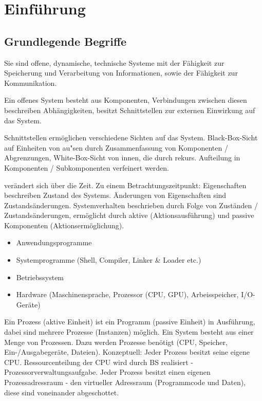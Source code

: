 \section{Einführung}
\subsection{Grundlegende Begriffe}
Sie sind offene, dynamische, technische Systeme mit der Fähigkeit zur Speicherung und Verarbeitung von Informationen, sowie der Fähigkeit zur Kommunikation.

Ein offenes System besteht aus Komponenten, Verbindungen zwischen diesen beschreiben Abhängigkeiten, besitzt Schnittstellen zur externen Einwirkung auf das System. 

Schnittstellen ermöglichen verschiedene Sichten auf das System. Black-Box-Sicht auf Einheiten von au"sen durch Zusammenfassung von Komponenten / Abgrenzungen, White-Box-Sicht von innen, die durch rekurs. Aufteilung in Komponenten / Subkomponenten verfeinert werden.
 
 verändert sich über die Zeit. Zu einem Betrachtungszeitpunkt: Eigenschaften beschreiben Zustand des Systems. Änderungen von Eigenschaften sind Zustands\-änderungen. System\-verhalten beschrieben durch Folge von Zuständen / Zustandsänderungen, ermöglicht durch aktive (Aktionsausführung) und passive Komponenten (Aktionsermöglichung).  

\begin{itemize} 	\setlength\itemsep{0em}
	\item Anwendungsprogramme
	\item Systemprogramme (Shell, Compiler, Linker \& Loader etc.)
	\item Betriebssystem
	\item Hardware (Maschinensprache, Prozessor (CPU, GPU), Arbeisspeicher, I/O-Geräte)
\end{itemize}

Ein Prozess (aktive Einheit) ist ein Programm (passive Einheit) in Ausführung, dabei sind mehrere Prozesse (Instanzen) möglich. Ein System besteht aus einer Menge von Prozessen. Dazu werden Prozesse benötigt (CPU, Speicher, Ein-/Ausgabegeräte, Dateien). Konzeptuell: Jeder Prozess besitzt seine eigene CPU. Ressourcenteilung der CPU wird durch BS realisiert - Prozessorverwaltungsaufgabe. Jeder Prozess besitzt einen eigenen Prozessadressraum - den virtueller Adressraum (Programmcode und Daten), diese sind voneinander abgeschottet.  

